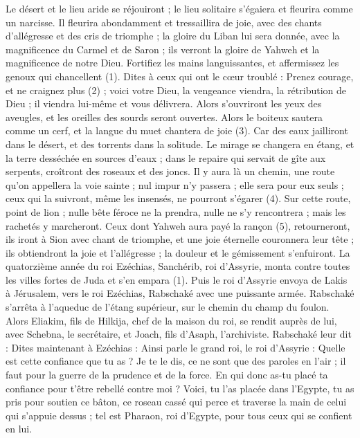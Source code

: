 \begin{multicols}{2}
\VerseOne{}Le désert et le lieu aride se réjouiront ; le lieu solitaire s'égaiera et fleurira comme un narcisse.
Il fleurira abondamment et tressaillira de joie, avec des chants d’allégresse et des cris de triomphe ; la gloire du Liban lui sera donnée, avec la magnificence du Carmel et de Saron ; ils verront la gloire de Yahweh et la magnificence de notre Dieu.
Fortifiez les mains languissantes, et affermissez les genoux qui chancellent (1).
Dites à ceux qui ont le cœur troublé : Prenez courage, et ne craignez plus (2) ; voici votre Dieu, la vengeance viendra, la rétribution de Dieu ; il viendra lui-même et vous délivrera.
Alors s’ouvriront les yeux des aveugles, et les oreilles des sourds seront ouvertes.
Alors le boiteux sautera comme un cerf, et la langue du muet chantera de joie (3). Car des eaux jailliront dans le désert, et des torrents dans la solitude.
Le mirage se changera en étang, et la terre desséchée en sources d’eaux ; dans le repaire qui servait de gîte aux serpents, croîtront des roseaux et des joncs.
Il y aura là un chemin, une route qu’on appellera la voie sainte ; nul impur n’y passera ; elle sera pour eux seuls ; ceux qui la suivront, même les insensés, ne pourront s’égarer (4).
Sur cette route, point de lion ; nulle bête féroce ne la prendra, nulle ne s’y rencontrera ; mais les rachetés y marcheront.
Ceux dont Yahweh aura payé la rançon (5), retourneront, ils iront à Sion avec chant de triomphe, et une joie éternelle couronnera leur tête ; ils obtiendront la joie et l'allégresse ; la douleur et le gémissement s'enfuiront.
\VerseOne{}La quatorzième année du roi Ezéchias, Sanchérib, roi d’Assyrie, monta contre toutes les villes fortes de Juda et s’en empara (1).
Puis le roi d’Assyrie envoya de Lakis à Jérusalem, vers le roi Ezéchias, Rabschaké avec une puissante armée. Rabschaké s’arrêta à l’aqueduc de l’étang supérieur, sur le chemin du champ du foulon.
Alors Eliakim, fils de Hilkija, chef de la maison du roi, se rendit auprès de lui, avec Schebna, le secrétaire, et Joach, fils d'Asaph, l’archiviste.
Rabschaké leur dit : Dites maintenant à Ezéchias : Ainsi parle le grand roi, le roi d’Assyrie : Quelle est cette confiance que tu as ?
Je te le dis, ce ne sont que des paroles en l’air ; il faut pour la guerre de la prudence et de la force. En qui donc as-tu placé ta confiance pour t’être rebellé contre moi ?
Voici, tu l’as placée dans l’Egypte, tu as pris pour soutien ce bâton, ce roseau cassé qui perce et traverse la main de celui qui s’appuie dessus ; tel est Pharaon, roi d’Egypte, pour tous ceux qui se confient en lui.

\end{multicols}
